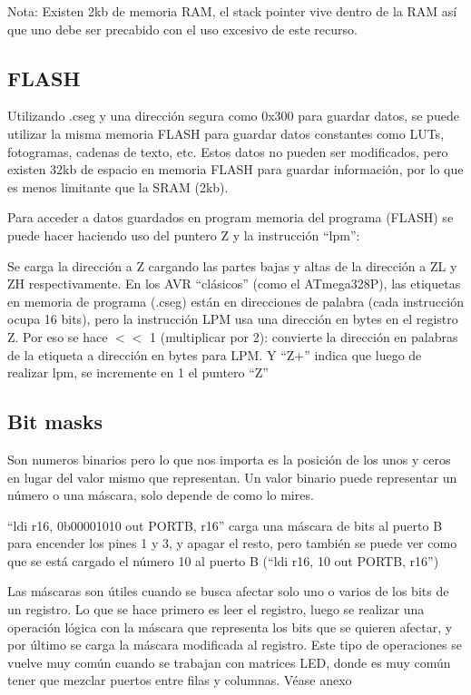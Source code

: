 Nota: Existen 2kb de memoria RAM, el stack pointer vive dentro de la RAM así que uno debe ser precabido con el uso excesivo de este recurso.

\subsection{FLASH}


Utilizando .cseg y una dirección segura como 0x300 para guardar datos, se puede utilizar la misma memoria FLASH para guardar datos constantes como LUTs, fotogramas, cadenas de texto, etc. Estos datos no pueden ser modificados, pero existen 32kb de espacio en memoria FLASH para guardar información, por lo que es menos limitante que la SRAM (2kb).

Para acceder a datos guardados en program memoria del programa (FLASH) se puede hacer haciendo uso del puntero Z y la instrucción ``lpm'':



Se carga la dirección a Z cargando las partes bajas y altas de la dirección a ZL y ZH respectivamente. En los AVR  ``clásicos'' (como el ATmega328P), las etiquetas en memoria de programa (.cseg) están en direcciones de palabra (cada instrucción ocupa 16 bits), pero la instrucción LPM usa una dirección en bytes en el registro Z. Por eso se hace $<$$<$ 1 (multiplicar por 2): convierte la dirección en palabras de la etiqueta a dirección en bytes para LPM. Y ``Z+'' indica que luego de realizar lpm, se incremente en 1 el puntero ``Z''

\subsection{Bit masks}
Son numeros binarios pero lo que nos importa es la posición de los unos y ceros en lugar del valor mismo que representan. Un valor binario puede representar un número o una máscara, solo depende de como lo mires.  

``ldi r16, 0b00001010 out PORTB, r16'' carga una máscara de bits al puerto B para encender los pines 1 y 3, y apagar el resto, pero también se puede ver como que se está cargado el número 10 al puerto B (``ldi r16, 10 out PORTB, r16'')

Las máscaras son útiles cuando se busca afectar solo uno o varios de los bits de un registro. Lo que se hace primero es leer el registro, luego se realizar una operación lógica con la máscara que representa los bits que se quieren afectar, y por último se carga la máscara modificada al registro. Este tipo de operaciones se vuelve muy común cuando se trabajan con matrices LED, donde es muy común tener que mezclar puertos entre filas y columnas. Véase anexo %


